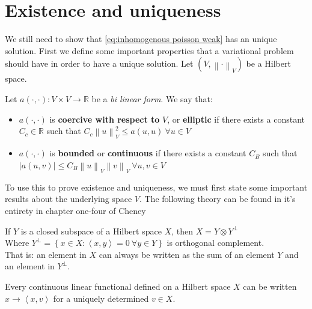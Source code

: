 \documentclass[../Main/main.tex]{subfiles}
\begin{document}
	\section*{Existence and uniqueness}
	We still need to show that \eqref{eq:inhomogenous poisson weak} has an unique solution.
	First we define some important properties that a variational problem should have in order to have a unique solution. Let $(V,\left \| \cdot \right \|_V)$ be a Hilbert space.
	\begin{definition} Let $a(\cdot,\cdot):V\times V \rightarrow \mathbb{R}$ be a \emph{bi linear form}. We say that:
			\begin{itemize}
			\item $a(\cdot,\cdot)$ is \textbf{coercive with respect to }$V$, or \textbf{elliptic} if there exists a constant $C_c\in \mathbb{R}$ such that $C_c\left \| u \right \|_V^2 \leq a(u,u) \ \forall u \in V$
			\item $a(\cdot,\cdot)$ is \textbf{bounded} or \textbf{continuous} if there exists a constant $C_B$ such that $|a(u,v)|\leq C_B\left \| u \right \|_V\left \| v \right \|_V \ \forall u,v \in V$
			\end{itemize}
	\end{definition}
	To use this to prove existence and uniqueness, we must first state some important results about the underlying space $V$. The following theory can be found in it's entirety in chapter one-four of Cheney \cite{Cheney}
	\begin{theorem}\label{th:decomposition of hilbert}
		If $Y$ is a closed subspace of a Hilbert space $X$, then $X = Y\otimes Y^{\bot}$ \\
		Where $Y^{\bot} = \left \{ \left. x\in X: \left \langle x,y \right \rangle=0 \ \forall y \in Y \right \} \right.$ is orthogonal complement.\\ That is: an element in $X$ can always be written as the sum of an element $Y$ and an element in $Y^{\bot}$.
	\end{theorem}
	\begin{theorem}\label{th:riesz representation}
		Every continuous linear functional defined on a Hilbert space $X$ can be written $x\rightarrow \left \langle x,v \right \rangle$ for a uniquely determined $v \in X$.
	\end{theorem}
\end{document}
